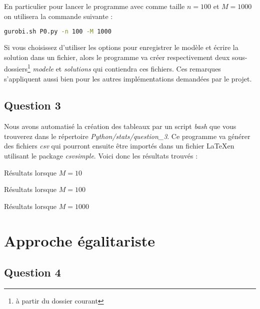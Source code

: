 \documentclass[a4paper, titlepage, oneside, 12pt]{article}%
\begin{document}
En particulier pour lancer le programme avec comme taille $n=100$ et $M=1000$ on utilisera la commande suivante :
\begin{lstlisting}[language=bash]
gurobi.sh P0.py -n 100 -M 1000
\end{lstlisting}

Si vous choisissez d'utiliser les options pour enregistrer le modèle et écrire la solution dans un fichier, alors le programme va créer respectivement deux sous-dossiers\footnote{à partir du dossier courant} \textit{modele} et \textit{solutions} qui contiendra ces fichiers. Ces remarques s'appliquent aussi bien pour les autres implémentations demandées par le projet.

\subsection{Question 3}

Nous avons automatisé la création des tableaux par un script \textit{bash} que vous trouverez dans le répertoire \textit{Python/stats/question\_3}. Ce programme va générer des fichiers \textit{csv} qui pourront ensuite être importés dans un fichier \LaTeX en utilisant le package \textit{csvsimple}. Voici donc les résultats trouvés :

\begin{table}[h]
\begin{center}
\caption{Résultats lorsque $M=10$}
\end{center}
\end{table}

\begin{table}[h]
\begin{center}
\caption{Résultats lorsque $M=100$}
\end{center}
\end{table}

\begin{table}[h]
\begin{center}
\caption{Résultats lorsque $M=1000$}
\end{center}
\end{table}
\section{Approche égalitariste}
\subsection{Question 4}
\end{document}
